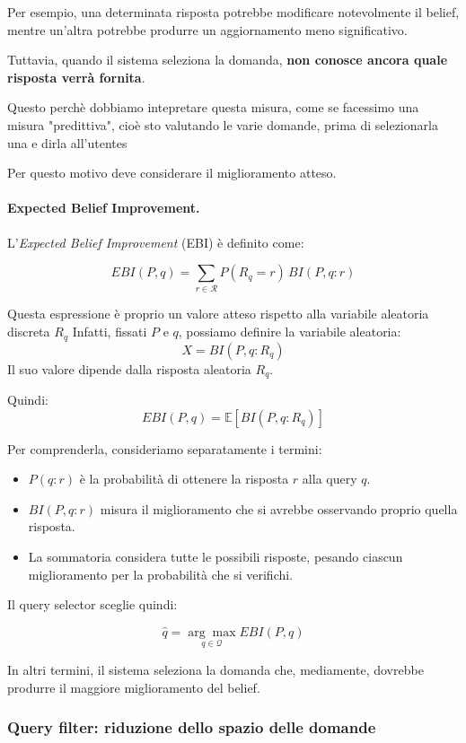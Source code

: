 Per esempio, una determinata risposta potrebbe modificare notevolmente il belief, mentre un'altra potrebbe produrre un aggiornamento meno significativo.

Tuttavia, quando il sistema seleziona la domanda, \textbf{non conosce ancora quale risposta verrà fornita}.

Questo perchè dobbiamo intepretare questa misura, come se facessimo una misura "predittiva", cioè sto valutando le varie domande, prima di selezionarla una e dirla all'utentes

Per questo motivo deve considerare il miglioramento atteso.

\paragraph{Expected Belief Improvement.}

L'\textit{Expected Belief Improvement} (EBI) è definito come:

\[
\boxed{
EBI(P,q)
=
\sum_{r\in\mathcal{R}}
P(R_q = r)\,BI(P,q:r)
}
\]

Questa espressione è proprio un valore atteso rispetto alla variabile aleatoria discreta \(R_q\)
Infatti, fissati \(P\) e \(q\), possiamo definire la variabile aleatoria:
\[
X=BI(P,q:R_q)
\]
Il suo valore dipende dalla risposta aleatoria \(R_q\).

Quindi:
\[
\boxed{
EBI(P,q)=\mathbb E[BI(P,q:R_q)]
}
\]


Per comprenderla, consideriamo separatamente i termini:

\begin{itemize}
    \item $P(q:r)$ è la probabilità di ottenere la risposta $r$ alla query $q$.
    \item $BI(P,q:r)$ misura il miglioramento che si avrebbe osservando proprio quella risposta.
    \item La sommatoria considera tutte le possibili risposte, pesando ciascun miglioramento per la probabilità che si verifichi.
\end{itemize}

Il query selector sceglie quindi:

\[
\boxed{
\hat q
=
\underset{q\in\mathcal{Q}}{\arg\max}
EBI(P,q)
}
\]

In altri termini, il sistema seleziona la domanda che, mediamente, dovrebbe produrre il maggiore miglioramento del belief.


\subsubsection{Query filter: riduzione dello spazio delle domande}

